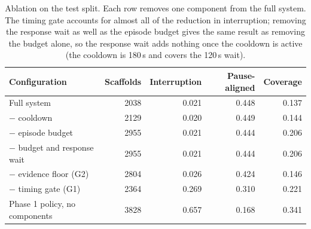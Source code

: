\begin{table}[t]
\centering
\caption{Ablation on the test split. Each row removes one component from the full
system. The timing gate accounts for almost all of the reduction in interruption;
removing the response wait as well as the episode budget gives the same result as removing
the budget alone, so the response wait adds nothing once the cooldown is active (the cooldown
is 180\,s and covers the 120\,s wait).}
\label{tab:ablation}
\begin{tabular}{lrrrr}
\toprule
Configuration & Scaffolds & Interruption & Pause-aligned & Coverage \\
\midrule
Full system & 2038 & 0.021 & 0.448 & 0.137 \\
$-$ cooldown & 2129 & 0.020 & 0.449 & 0.144 \\
$-$ episode budget & 2955 & 0.021 & 0.444 & 0.206 \\
$-$ budget and response wait & 2955 & 0.021 & 0.444 & 0.206 \\
$-$ evidence floor (G2) & 2804 & 0.026 & 0.424 & 0.146 \\
$-$ timing gate (G1) & 2364 & 0.269 & 0.310 & 0.221 \\
Phase 1 policy, no components & 3828 & 0.657 & 0.168 & 0.341 \\
\bottomrule
\end{tabular}
\end{table}

